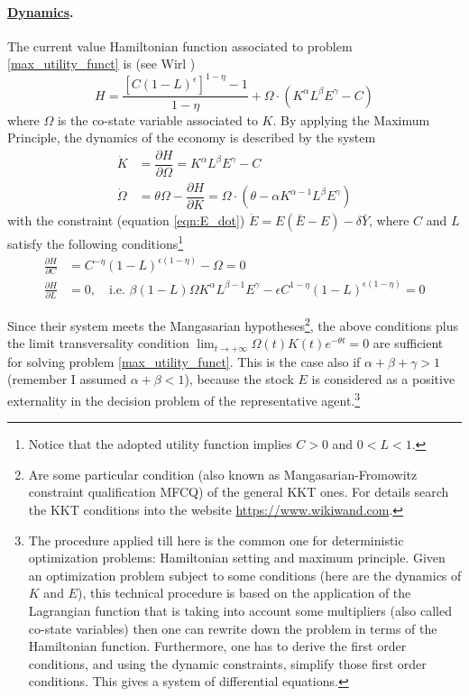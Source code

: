 \paragraph{\underline{Dynamics}.}
The current value Hamiltonian function associated to problem \eqref{max_utility_funct} is 
(see Wirl \cite{wirl_stability_1997}) 
$$H=\frac{[C(1-L)^{\epsilon}]^{1-\eta} -1}{1-\eta} + \Omega\cdot(K^\alpha L^\beta E^\gamma - C)$$
where $\Omega$ is the co-state variable associated to $K$. By applying the Maximum Principle, the dynamics of the economy is described by the system
\begin{equation} \label{eqn:K_dot_Omega_dot}
\begin{split}
	\dot{K}& =\dfrac{\partial H}{\partial\Omega} = K^\alpha L^\beta E^\gamma-C \\
	\dot{\Omega}& =\theta\Omega-\dfrac{\partial H}{\partial K}=\Omega\cdot(\theta-\alpha K^{\alpha-1}L^\beta E^\gamma)
\end{split}
\end{equation}
with the constraint (equation \eqref{eqn:E_dot}) $\dot{E} = E(\bar{E}-E)-\delta\bar{Y}$, where $C$ and $L$ satisfy the following conditions\footnote{Notice that the adopted utility function implies $C>0$ and $0<L<1$.} 
\begin{equation} 
\begin{split}
	\frac{\partial H}{\partial C}& =C^{-\eta}(1-L)^{\epsilon(1-\eta)}-\Omega=0 \\
	\frac{\partial H}{\partial L}& =0, \quad \text{i.e.}\,\, \beta(1-L)\Omega K^\alpha L^{\beta-1}E^\gamma-\epsilon C^{1-\eta}(1-L)^{\epsilon(1-\eta)}=0
\end{split}
\end{equation}

Since their system meets the Mangasarian hypotheses\footnote{Are some particular condition (also known as Mangasarian-Fromowitz constraint qualification MFCQ) of the general KKT ones. For details search the KKT conditions into the website \url{https://www.wikiwand.com}.}, the above conditions plus the limit transversality condition $\lim_{t\rightarrow +\infty} \Omega(t)K(t)e^{-\theta t} = 0$ are sufficient for solving problem \eqref{max_utility_funct}. This is the case also if $\alpha+\beta+\gamma>1$ (remember I assumed $\alpha + \beta < 1$), because the stock $E$ is considered as a positive externality in the decision problem of the representative agent.\footnote{The procedure applied till here is the common one for deterministic optimization problems: Hamiltonian setting and maximum principle. Given an optimization problem subject to some conditions (here are the dynamics of $K$ and $E$), this technical procedure is based on the application of the Lagrangian function that is taking into account some multipliers (also called co-state variables) then one can rewrite down the problem in terms of the Hamiltonian function. Furthermore, one has to derive the first order conditions, and using the dynamic constraints, simplify those first order conditions. This gives a system of differential equations.}

